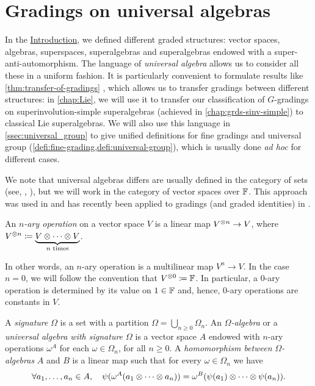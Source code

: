 
\section{Gradings on universal algebras}\label{sec:Omega-algebras}

In the \hyperref[chap:intro]{Introduction}, we defined different graded structures: vector spaces, algebras, superspaces, superalgebras and superalgebras endowed with a super-anti-automorphism. 
The language of \emph{universal algebra} allows us to consider all these in a uniform fashion. 
It is particularly convenient to formulate results like \cref{thm:transfer-of-gradings} , which allows us to transfer gradings between different structures: in \cref{chap:Lie}, we will use it to transfer our classification of $G$-gradings on superinvolution-simple superalgebras (achieved in \cref{chap:grds-sinv-simple}) to classical Lie superalgebras. 
We will also use this language in \cref{ssec:universal_group} to give unified definitions for fine gradings and universal group (\cref{defi:fine-grading,defi:universal-group}), which is usually done \emph{ad hoc} for different cases. 

We note that universal algebras differs are usually defined in the category of sets (see, \eg, \cite{Cohn_universal}), but we will work in the category of vector spaces over $\mathbb{F}$. 
This approach was used in \cite{Razmyslov} and has recently been applied to gradings (and graded identities) in \cite{MR3886336}. 

\begin{defi}
    An \emph{$n$-ary operation} on a vector space $V$ is 
    a linear map $V^{\otimes n} \to V$, where $V^{\otimes n} \coloneqq \underbrace{V\otimes\cdots\otimes V}_{n \text{ times}}$. 
\end{defi}

In other words, an $n$-ary operation is a multilinear map $V^n \to V$. 
In the case $n = 0$, we will follow the convention that $V^{\otimes 0} \coloneqq \mathbb{F}$. 
In particular, a $0$-ary operation is determined by its value on $1 \in \mathbb{F}$ and, hence, $0$-ary operations are constants in $V$. 

\begin{defi}\label{def:universal-algebra}
	A \emph{signature} $\Omega$ is a set with a partition $\Omega = \bigcup_{n \geq 0} \Omega_n$.
	An \emph{$\Omega$-algebra} or a \emph{universal algebra with signature $\Omega$} is a vector space $A$ endowed with $n$-ary operations $\omega^A$ for each $\omega \in \Omega_n$, for all $n \geq 0$. 
	A \emph{homomorphism between $\Omega$-algebras} $A$ and $B$ is a linear map such that for every $\omega \in \Omega_n$ we have
	\[
		\forall a_1, \ldots, a_n \in A, \quad 
		\psi( \omega^A (a_1 \otimes \cdots \otimes a_n) ) = \omega^B ( \psi(a_1) \otimes \cdots \otimes \psi(a_n) ). 
	\]
\end{defi}

